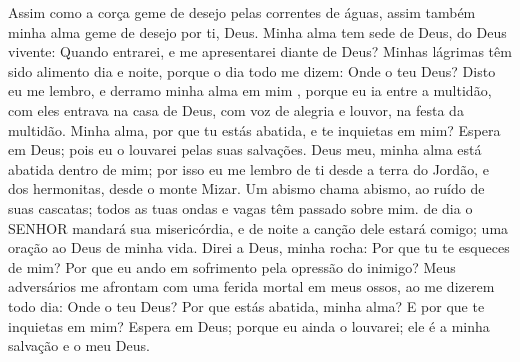 {\PP 
  Assim como a corça geme de desejo pelas correntes de águas, assim também minha alma geme de desejo por ti, Deus.
  Minha alma tem sede de Deus, do Deus vivente: Quando entrarei, e me apresentarei diante de Deus?
  Minhas lágrimas têm sido
{} alimento dia e noite, porque o dia todo me dizem: Onde
{} o teu Deus?
  Disto eu me lembro, e derramo minha alma em mim
{},  porque eu ia entre a multidão,
{} com eles entrava na casa de Deus, com voz de alegria e louvor, na festa da multidão.
  Minha alma, por que tu estás abatida, e te inquietas em mim? Espera em Deus; pois eu o louvarei pelas suas salvações.
  Deus meu, minha alma está abatida dentro de mim; por isso eu me lembro de ti desde a terra do Jordão, e dos hermonitas, desde o monte Mizar.
  Um abismo chama
{} abismo, ao ruído de suas cascatas; todos as tuas ondas e vagas têm passado sobre mim.
   de dia o SENHOR mandará sua misericórdia, e de noite a canção dele estará comigo; uma oração ao Deus de minha vida.
  Direi a Deus, minha rocha: Por que tu te esqueces de mim? Por que eu ando em sofrimento pela opressão do inimigo?
  Meus adversários me afrontam com uma ferida mortal em meus ossos, ao me dizerem todo dia: Onde
{} o teu Deus?
  Por que estás abatida, minha alma? E por que te inquietas em mim? Espera em Deus; porque eu ainda o louvarei; ele é a minha salvação
 e o meu Deus.
\par }



